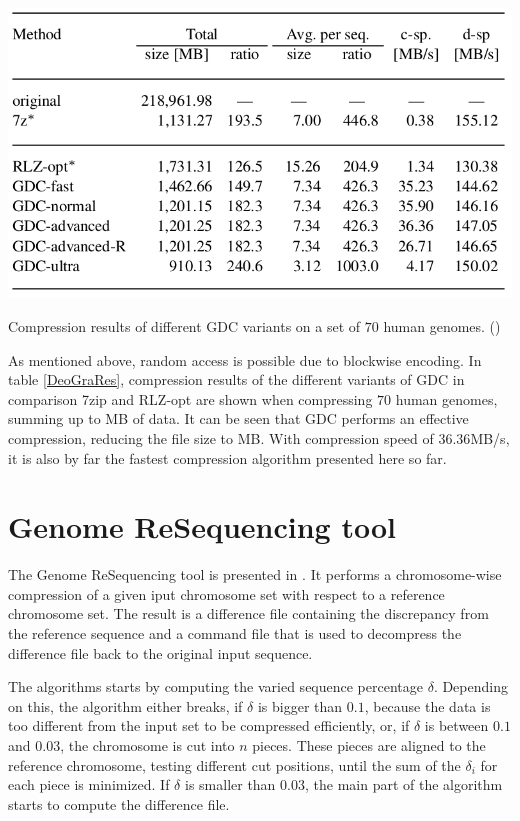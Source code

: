 \documentclass[acmtocl,acmnow]{article}
\begin{document}
\begin{table}
  \begin{center}
    \includegraphics[width=1\textwidth]{img/DeoGraRes.png}
    \label{DeoGraRes}
    \caption{Compression results of different GDC variants on a set of $70$ human genomes. (\cite{Kur})}
  \end{center}
\end{table}

As mentioned above, random access is possible due to blockwise encoding.
In table \ref{DeoGraRes}, compression results of the different variants of GDC in comparison 7zip and 
RLZ-opt are shown when compressing $70$ human genomes, summing up to MB of data.
It can be seen that GDC performs an effective compression, reducing the file size to MB. With 
compression speed of $36.36$MB/s, it is also by far the fastest compression algorithm presented here so far.

\section{Genome ReSequencing tool}

The Genome ReSequencing tool is presented in \cite{WaZh}. It performs a chromosome-wise compression of a given iput
chromosome set with respect to a reference chromosome set. The result is a difference file containing the discrepancy from
the reference sequence and a command file that is used to decompress the difference file back to the original input 
sequence.

The algorithms starts by computing the varied sequence percentage $\delta$. Depending on this, the algorithm either breaks,
if $\delta$ is bigger than $0.1$, because the data is too different from the input set to be compressed efficiently,
or, if $\delta$ is between $0.1$ and $0.03$, the chromosome is cut into $n$ pieces. These pieces are aligned to the reference
chromosome, testing different cut positions, %
until the sum of the $\delta_i$ for each piece is minimized.
If $\delta$ is smaller than $0.03$, the main part of the algorithm starts to compute the difference file.
\end{document}
